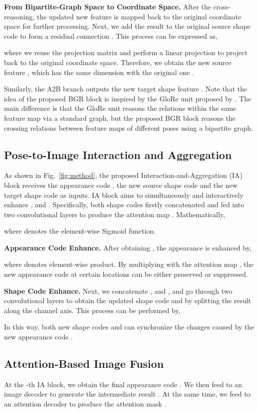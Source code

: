 \documentclass{bmvc2k}
\begin{document}
\noindent \textbf{From Bipartite-Graph Space to Coordinate Space.}
After the cross-reasoning, the updated new feature  is mapped back to the original coordinate space for further processing.
Next, we add the result to the original source shape code  to form a residual connection \cite{he2016deep}.
This process can be expressed as,

where we reuse the projection matrix  and perform a linear projection
 to project  back to the original coordinate space. 
Therefore, we obtain the new source feature , which has the same dimension with the original one .

Similarly, the A2B branch outputs the new target shape feature . 
Note that the idea of the proposed BGR block is inspired by the GloRe unit proposed by \cite{chen2019graph}. 
The main difference is that the GloRe unit reasons the relations within the same feature map via a standard graph, but the proposed BGR block reasons the crossing relations between feature maps of different poses using a bipartite graph.

\subsection{Pose-to-Image Interaction and Aggregation}
As shown in Fig.~\ref{fig:method}, the proposed Interaction-and-Aggregation (IA) block receives the appearance code , the new source shape code  and the new target shape code  as inputs.
IA block aims to simultaneously and interactively enhance ,  and .
Specifically, both shape codes firstly concatenated and fed into two convolutional layers to produce the attention map .
Mathematically,

where  denotes the element-wise Sigmoid function. 

\noindent \textbf{Appearance Code Enhance.} After obtaining , the appearance  is enhanced by,

where  denotes element-wise product. By multiplying with the attention map , the new appearance code  at certain locations can be either preserved or suppressed. 

\noindent \textbf{Shape Code Enhance.}
Next, we concatenate ,  and , and go through two convolutional layers to obtain the updated shape code  and  by splitting the result along the channel axis.
This process can be performed by,

In this way, both new shape codes  and  can synchronize the changes caused by the new appearance code . 

\subsection{Attention-Based Image Fusion}
At the -th IA block, we obtain the final appearance code .
We then feed  to an image decoder to generate the intermediate result .
At the same time, we feed  to an attention decoder to produce the attention mask .
\end{document}
